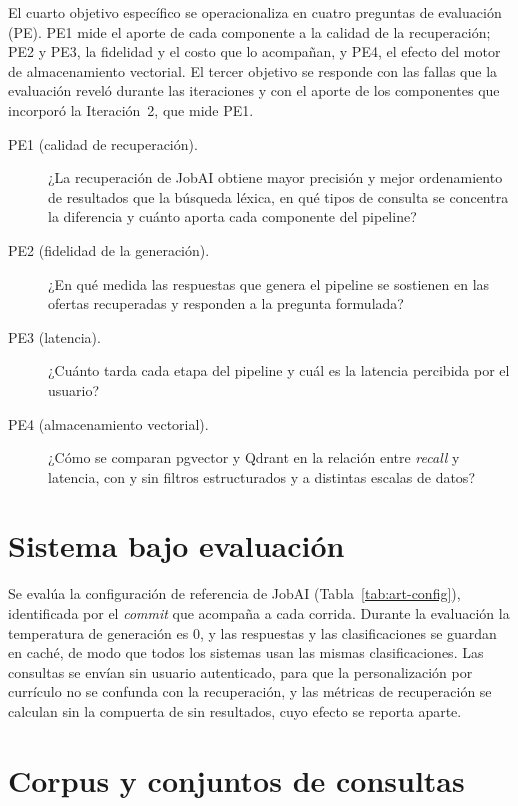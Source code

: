 El cuarto objetivo específico se operacionaliza en cuatro preguntas de evaluación (PE). PE1 mide el aporte de cada componente a la calidad de la recuperación; PE2 y PE3, la fidelidad y el costo que lo acompañan, y PE4, el efecto del motor de almacenamiento vectorial. El tercer objetivo se responde con las fallas que la evaluación reveló durante las iteraciones y con el aporte de los componentes que incorporó la Iteración~2, que mide PE1.

\begin{description}
    \item[PE1 (calidad de recuperación).] ¿La recuperación de JobAI obtiene mayor precisión y mejor ordenamiento de resultados que la búsqueda léxica, en qué tipos de consulta se concentra la diferencia y cuánto aporta cada componente del pipeline?
    \item[PE2 (fidelidad de la generación).] ¿En qué medida las respuestas que genera el pipeline se sostienen en las ofertas recuperadas y responden a la pregunta formulada?
    \item[PE3 (latencia).] ¿Cuánto tarda cada etapa del pipeline y cuál es la latencia percibida por el usuario?
    \item[PE4 (almacenamiento vectorial).] ¿Cómo se comparan pgvector y Qdrant en la relación entre \textit{recall} y latencia, con y sin filtros estructurados y a distintas escalas de datos?
\end{description}

\section{Sistema bajo evaluación}
\label{sec:met-sistema}

Se evalúa la configuración de referencia de JobAI (Tabla~\ref{tab:art-config}), identificada por el \textit{commit} que acompaña a cada corrida. Durante la evaluación la temperatura de generación es 0, y las respuestas y las clasificaciones se guardan en caché, de modo que todos los sistemas usan las mismas clasificaciones. Las consultas se envían sin usuario autenticado, para que la personalización por currículo no se confunda con la recuperación, y las métricas de recuperación se calculan sin la compuerta de sin resultados, cuyo efecto se reporta aparte.

\section{Corpus y conjuntos de consultas}
\label{sec:met-corpus}

